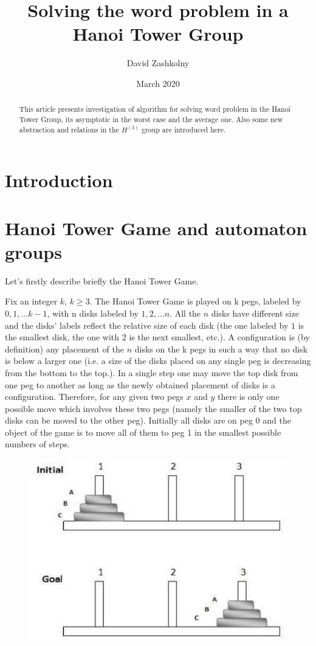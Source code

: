 \documentclass{article}
\title{ Solving the word problem in a Hanoi Tower Group }
\author{ David Zashkolny }
\date{March 2020}
\begin{document}
\maketitle

\begin{abstract}
	This article presents investigation of algorithm for solving word problem in 
	the Hanoi Tower Group, its asymptotic in the worst case and the average one. Also some new abstraction and relations in the $H^{(3)}$ group are introduced here.
	
\end{abstract}

\section{Introduction}

\newpage

\section{Hanoi Tower Game and automaton groups}

Let's firstly describe briefly the Hanoi Tower Game. 

Fix an integer $k, \, k \ge 3$. The Hanoi Tower Game is played on k pegs, labeled by
$0, 1, ... k-1$, with n disks labeled by $1, 2, ... n$. All the $n$ disks have different
size and the disks' labels  reflect the relative size of each disk (the one labeled 
by $1$ is the smallest disk, the one with $2$ is the next smallest, etc.). A
configuration is (by definition) any placement of the $n$ disks on the k pegs in such 
a way that no disk is below a larger one (i.e. a size of the disks placed on any single 
peg is decreasing from the bottom to the top.). In a single step one may move the top 
disk from one peg to another as long as the newly obtained placement of disks is a 
configuration. Therefore, for any given two pegs $x$ and $y$ there is only one possible 
move which involves these two pegs (namely the smaller of the two top disks can be moved
to the other peg). Initially all disks are on peg $0$ and the object of the game is to
move all of them to peg 1 in the smallest possible numbers of steps.

\begin{figure}[h]
	\includegraphics[scale=0.5]{../graphs/hanoi_tower.jpg}
	\centering
\end{figure}
\end{document}
